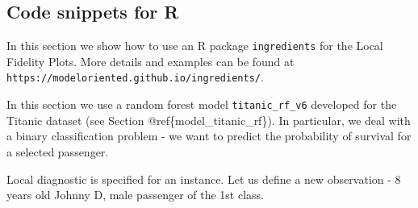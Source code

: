 \documentclass[12pt,]{krantz}
\newenvironment{Shaded}{\begin{snugshade}}{\end{snugshade}}
\newcommand{\DataTypeTok}[1]{\textcolor[rgb]{0.13,0.29,0.53}{#1}}
\newcommand{\DecValTok}[1]{\textcolor[rgb]{0.00,0.00,0.81}{#1}}
\newcommand{\KeywordTok}[1]{\textcolor[rgb]{0.13,0.29,0.53}{\textbf{#1}}}
\newcommand{\NormalTok}[1]{#1}
\newcommand{\OperatorTok}[1]{\textcolor[rgb]{0.81,0.36,0.00}{\textbf{#1}}}
\newcommand{\StringTok}[1]{\textcolor[rgb]{0.31,0.60,0.02}{#1}}
\theoremstyle{definition}
\theoremstyle{definition}
\theoremstyle{definition}
\theoremstyle{remark}
\begin{document}
\hypertarget{code-snippets-for-r-3}{%
\subsection{Code snippets for R}\label{code-snippets-for-r-3}}

In this section we show how to use an R package \texttt{ingredients}
\citep{R-ingredients} for the Local Fidelity Plots. More details and
examples can be found at
\texttt{https://modeloriented.github.io/ingredients/}.

In this section we use a random forest \citep{R-randomForest} model
\texttt{titanic\_rf\_v6} developed for the Titanic dataset (see Section
@ref\{model\_titanic\_rf\}). In particular, we deal with a binary
classification problem - we want to predict the probability of survival
for a selected passenger.

\begin{Shaded}
\end{Shaded}

Local diagnostic is specified for an instance. Let us define a new
observation - 8 years old Johnny D, male passenger of the 1st class.
\end{document}
